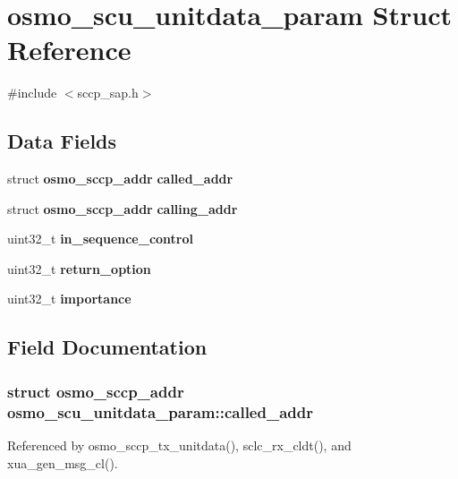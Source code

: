 \section{osmo\+\_\+scu\+\_\+unitdata\+\_\+param Struct Reference}
\label{structosmo__scu__unitdata__param}


{\ttfamily \#include $<$sccp\+\_\+sap.\+h$>$}

\subsection*{Data Fields}
\begin{DoxyCompactItemize}
\item 
struct {\bf osmo\+\_\+sccp\+\_\+addr} {\bf called\+\_\+addr}
\item 
struct {\bf osmo\+\_\+sccp\+\_\+addr} {\bf calling\+\_\+addr}
\item 
uint32\+\_\+t {\bf in\+\_\+sequence\+\_\+control}
\item 
uint32\+\_\+t {\bf return\+\_\+option}
\item 
uint32\+\_\+t {\bf importance}
\end{DoxyCompactItemize}


\subsection{Field Documentation}
\subsubsection[{called\+\_\+addr}]{\setlength{\rightskip}{0pt plus 5cm}struct {\bf osmo\+\_\+sccp\+\_\+addr} osmo\+\_\+scu\+\_\+unitdata\+\_\+param\+::called\+\_\+addr}\label{structosmo__scu__unitdata__param_a8d987c9839b469aa0ff361e9983db0aa}


Referenced by osmo\+\_\+sccp\+\_\+tx\+\_\+unitdata(), sclc\+\_\+rx\+\_\+cldt(), and xua\+\_\+gen\+\_\+msg\+\_\+cl().

